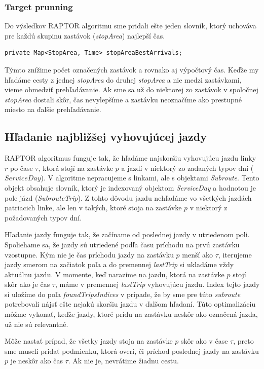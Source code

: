 \subsubsection{Target prunning}
Do výsledkov RAPTOR algoritmu sme pridali ešte jeden slovník, ktorý uchováva pre každú skupinu zastávok (\textit{stopArea}) najlepší čas. 
\begin{lstlisting}
private Map<StopArea, Time> stopAreaBestArrivals;
\end{lstlisting}
Týmto znížime počet označených zastávok a rovnako aj výpočtový čas. Keďže my hľadáme cesty z jednej \textit{stopArea} do druhej \textit{stopArea} a nie medzi zastávkami, vieme obmedziť prehľadávanie. Ak sme sa už do niektorej zo zastávok v spoločnej \textit{stopArea} dostali skôr, čas nevylepšíme a zastávku neoznačíme ako prestupné miesto na ďalšie prehľadávanie. 

\subsection{Hľadanie najbližšej vyhovujúcej jazdy}
\label{sec:trip-finding}
RAPTOR algoritmus funguje tak, že hľadáme najskoršiu vyhovujúcu jazdu linky $r$ po čase $\tau$, ktorá stojí na zastávke $p$ a jazdí v niektorý zo zadaných typov dní ($ServiceDay$). V algoritme nepracujeme s linkami, ale s objektami \textit{Subroute}. Tento objekt obsahuje slovník, ktorý je indexovaný objektom \textit{ServiceDay} a hodnotou je pole jázd (\textit{SubrouteTrip}). Z tohto dôvodu jazdu nehľadáme vo všetkých jazdách patriacich linke, ale len v takých, ktoré stoja na zastávke $p$ v niektorý z požadovaných typov dní. 

Hľadanie jazdy funguje tak, že začíname od poslednej jazdy v utriedenom poli. Spoliehame sa, že jazdy sú utriedené podľa času príchodu na prvú zastávku vzostupne. Kým nie je čas príchodu jazdy na zastávku $p$ menší ako $\tau$, iterujeme jazdy smerom na začiatok poľa a do premennej \textit{lastTrip} si ukladáme vždy aktuálnu jazdu. V momente, keď narazíme na jazdu, ktorá na zastávke $p$ stojí skôr ako je čas $\tau$, máme v premennej \textit{lastTrip} vyhovujúcu jazdu. Index tejto jazdy si uložíme do poľa \textit{foundTripsIndices} v prípade, že by sme pre túto \textit{subroute} potrebovali nájsť ešte nejakú skoršiu jazdu v ďalšom hľadaní. Túto optimalizáciu môžme vykonať, keďže jazdy, ktoré prídu na zastávku neskôr ako označená jazda, už nie sú relevantné.

Môže nastať prípad, že všetky jazdy stoja na zastávke $p$ skôr ako v čase $\tau$, preto sme museli pridať podmienku, ktorá overí, či príchod poslednej jazdy na zastávku $p$ je neskôr ako čas $\tau$. Ak nie je, nevrátime žiadnu cestu. 

